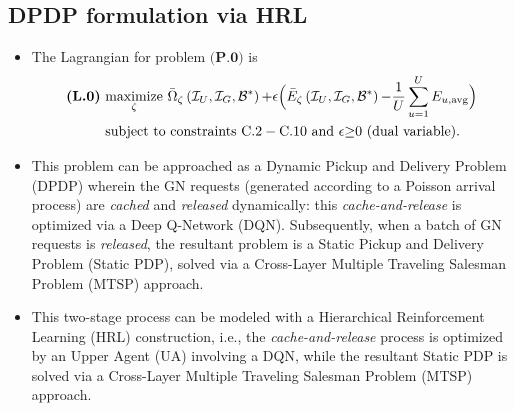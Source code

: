 \documentclass{article}
\begin{document}
\subsection{DPDP formulation via HRL}
\begin{itemize}
    \item The Lagrangian for problem $\textbf{(P.0)}$ is
    \begin{align}\label{Summarized_optimization_problem}
         \textbf{(L.0)}\ &\underset{\zeta}{\mathrm{maximize}}\ \Bar{\Omega}_{\zeta}\left(\mathcal{I}_{U},\mathcal{I}_{G},\mathcal{B}^{*}\right){+}\epsilon\Big(\Bar{E}_{\zeta}\left(\mathcal{I}_{U},\mathcal{I}_{G},\mathcal{B}^{*}\right){-}\frac{1}{U}\sum_{u{=}1}^{U}E_{u,\mathrm{avg}}\Big)\nonumber\\
         &\text{subject to constraints }\mathrm{C.2-C.10}\text{ and }\epsilon{\geq}0\text{ (dual variable)}.
    \end{align}
    \item This problem can be approached as a Dynamic Pickup and Delivery Problem (DPDP) wherein the GN requests (generated according to a Poisson arrival process) are \emph{cached} and \emph{released} dynamically: this \emph{cache-and-release} is optimized via a Deep Q-Network (DQN). Subsequently, when a batch of GN requests is \emph{released}, the resultant problem is a Static Pickup and Delivery Problem (Static PDP), solved via a Cross-Layer Multiple Traveling Salesman Problem (MTSP) approach.
    \item This two-stage process can be modeled with a Hierarchical Reinforcement Learning (HRL) construction, i.e., the \emph{cache-and-release} process is optimized by an Upper Agent (UA) involving a DQN, while the resultant Static PDP is solved via a Cross-Layer Multiple Traveling Salesman Problem (MTSP) approach.
\end{itemize}
\end{document}
